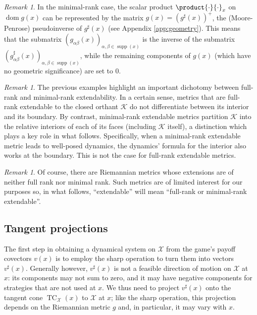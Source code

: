 \documentclass[reqno]{amsart}
\theoremstyle{plain}
\theoremstyle{definition}
\theoremstyle{remark}
\newtheorem{remark}[theorem]{Remark}
\numberwithin{equation}{section}
\numberwithin{theorem}{section}
\begin{document}
\begin{remark}
\label{rem:gsharpBdMin}
In the minimal-rank case, the scalar product $\product{\mathopen{}\cdot\mathopen{}}{\mathopen{}\cdot\mathopen{}}_{x}$ on ${\operatorname{dom} g}(x)$ can be represented by the matrix $g(x) = (g^{\sharp}(x))^+$, the (Moore-Penrose) pseudoinverse of $g^{\sharp}(x)$ (see Appendix \ref{app:geometry}).
This means that the submatrix $(g_{\alpha\beta}(x))_{\alpha,\beta \in \operatorname{supp}(x)}$ is the inverse of the submatrix $(g_{\alpha\beta}^{\sharp}(x))_{\alpha,\beta \in \operatorname{supp}(x)}$, while the remaining components of $g(x)$ (which have no geometric significance) are set to $0$.
\end{remark}

\begin{remark}
The previous examples highlight an important dichotomy between full-rank and minimal-rank extendability.
In a certain sense, metrics that are full-rank extendable to the closed orthant ${\mathcal{K}}$ do not differentiate between its interior and its boundary.
By contrast, minimal-rank extendable metrics partition ${\mathcal{K}}$ into the relative interiors of each of its faces (including ${\mathcal{K}}$ itself), a distinction which plays a key role in what follows.
Specifically, when a minimal-rank extendable metric leads to well-posed dynamics, the dynamics' formula for the interior also works at the boundary.
This is not the case for full-rank extendable metrics.
\end{remark}

\begin{remark}
Of course, there are Riemannian metrics whose extensions are of neither full rank nor minimal rank.
Such metrics are of limited interest for our purposes so, in what follows, ``extendable'' will mean ``full-rank or minimal-rank extendable''.
\end{remark}

\subsection{Tangent projections}
\label{sec:proj}

The first step in obtaining a dynamical system on ${\mathcal{X}}$ from the game's payoff covectors ${v}(x)$ is to employ the sharp operation to turn them into vectors ${v}^{\sharp}(x)$.
Generally however, ${v}^{\sharp}(x)$ is not a feasible direction of motion on ${\mathcal{X}}$ at $x$:
its components may not sum to zero, and it may have negative components for strategies that are not used at $x$.
We thus need to project ${v}^{\sharp}(x)$ onto the tangent cone $\operatorname{TC}_{\mathcal{X}}(x)$ to ${\mathcal{X}}$ at $x$;
like the sharp operation, this projection depends on the Riemannian metric $g$ and, in particular, it may vary with $x$.
\end{document}

